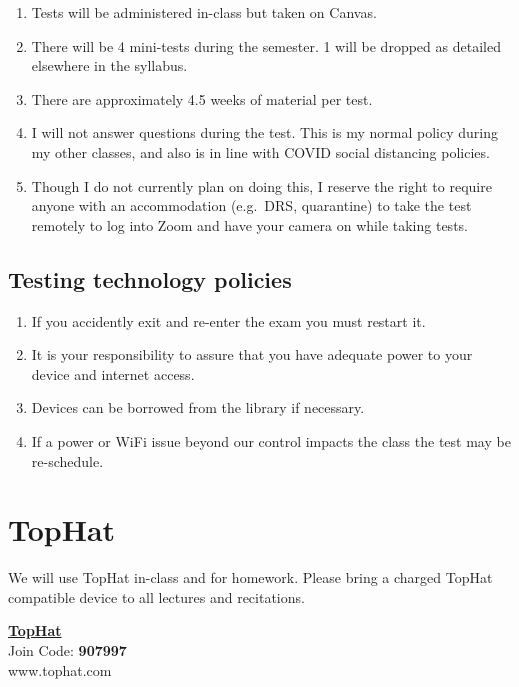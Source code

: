 \documentclass[
]{book}
\providecommand{\tightlist}{%
  \setlength{\itemsep}{0pt}\setlength{\parskip}{0pt}}
\begin{document}
\begin{enumerate}
\def\labelenumi{\arabic{enumi}.}
\tightlist
\item
  Tests will be administered in-class but taken on Canvas.
\item
  There will be 4 mini-tests during the semester. 1 will be dropped as detailed elsewhere in the syllabus.
\item
  There are approximately 4.5 weeks of material per test.
\item
  I will not answer questions during the test. This is my normal policy during my other classes, and also is in line with COVID social distancing policies.
\item
  Though I do not currently plan on doing this, I reserve the right to require anyone with an accommodation (e.g.~DRS, quarantine) to take the test remotely to log into Zoom and have your camera on while taking tests.
\end{enumerate}

\hypertarget{testing-technology-policies}{%
\section{Testing technology policies}\label{testing-technology-policies}}

\begin{enumerate}
\def\labelenumi{\arabic{enumi}.}
\tightlist
\item
  If you accidently exit and re-enter the exam you must restart it.
\item
  It is your responsibility to assure that you have adequate power to your device and internet access.
\item
  Devices can be borrowed from the library if necessary.
\item
  If a power or WiFi issue beyond our control impacts the class the test may be re-schedule.
\end{enumerate}

\hypertarget{tophat}{%
\chapter{TopHat}\label{tophat}}

We will use TopHat in-class and for homework. Please bring a charged TopHat compatible device to all lectures and recitations.

\href{www.tophat.com}{\textbf{TopHat}}\\
Join Code: \textbf{907997}\\
www.tophat.com
\end{document}
